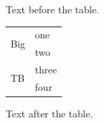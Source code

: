 \documentclass[12pt]{article}
\begin{document}
Text before the table.

\begin{tabular}{ll}\multirow{2}[2]{*}{Big} & one\\ & two\\\multirow{2}[tb2]{*}{TB} & three\\ & four\\\end{tabular}

Text after the table.
\end{document}
